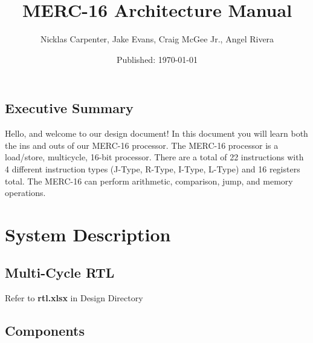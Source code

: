 \documentclass[12pt, a4paper]{report}
\author{Nicklas Carpenter, Jake Evans, Craig McGee Jr., Angel Rivera}
\date{Published: \today}
\title{MERC-16 Architecture	Manual}
\begin{document}
	\maketitle
	
	\tableofcontents
	\newpage
	
	\begin{center}
		\section*{Executive Summary}
		Hello, and welcome to our design document!  In this document you will learn both the ins and outs of our MERC-16 processor.  The MERC-16 processor is a load/store, multicycle, 16-bit processor.  There are a total of 22 instructions with 4 different instruction types (J-Type, R-Type, I-Type, L-Type) and 16 registers total.  The MERC-16 can perform arithmetic, comparison, jump, and memory operations. 
	\end{center}
	
	
	
	\chapter{System Description}
	\newpage
	\section{Multi-Cycle RTL}
	
	Refer to \textbf{rtl.xlsx} in Design Directory
	
	\section{Components}
	
\end{document}
